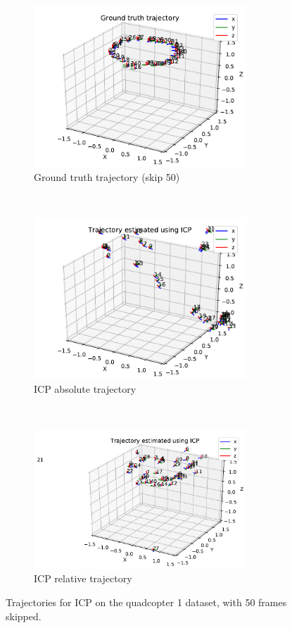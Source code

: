 \documentclass[12pt,a4paper]{article}
\begin{document}
     \begin{figure}[p]
      \begin{subfigure}[t]{\textwidth}
      \centering
        \includegraphics[width=80mm]{../quad/basic-reg-saves/50/atrj_gt.pdf}
        \caption{Ground truth trajectory (skip 50)}
      \end{subfigure} 
      \\
      \begin{subfigure}[t]{0.5\textwidth}
        \includegraphics[width=80mm]{../quad/basic-reg-saves/50/atrj_icp.pdf}
        \caption{ICP absolute trajectory}
      \end{subfigure} %
      ~
      \begin{subfigure}[t]{0.5\textwidth}
      \centering
        \includegraphics[width=80mm]{../quad/basic-reg-saves/50/rtrj_icp.pdf}
        \caption{ICP relative trajectory}
      \end{subfigure} 
      \caption{Trajectories for ICP on the quadcopter 1 dataset, with 50 frames skipped.}
      \label{f: quad3 trj}
    \end{figure}




\end{document}

